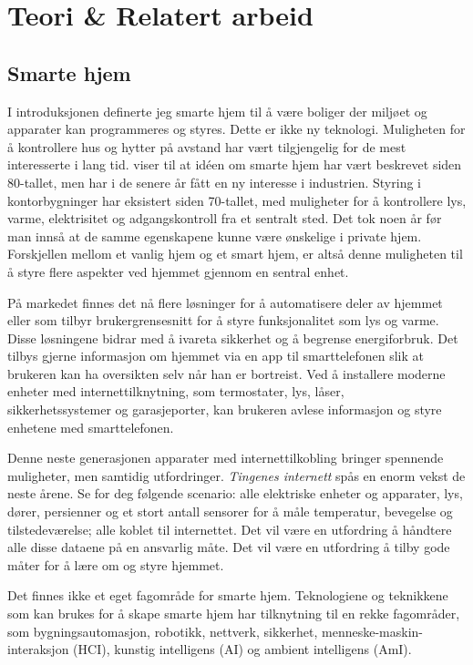 \section[Teori \& Relatert arbeid]{Teori \& Relatert arbeid}
\subsection{Smarte hjem}
\label{ch:smartehjem}
I introduksjonen definerte jeg smarte hjem til å være boliger der miljøet og apparater kan programmeres og styres. Dette er ikke ny teknologi. Muligheten for å kontrollere hus og hytter på avstand har vært tilgjengelig for de mest interesserte i lang tid. \citet{peine08} viser til at idéen om smarte hjem har vært beskrevet siden 80-tallet, men har i de senere år fått en ny interesse i industrien. Styring i kontorbygninger har eksistert siden 70-tallet, med muligheter for å kontrollere lys, varme, elektrisitet og adgangskontroll fra et sentralt sted. Det tok noen år før man innså at de samme egenskapene kunne være ønskelige i private hjem. Forskjellen mellom et vanlig hjem og et smart hjem, er altså denne muligheten til å styre flere aspekter ved hjemmet gjennom en sentral enhet.

På markedet finnes det nå flere løsninger for å automatisere deler av hjemmet eller som tilbyr brukergrensesnitt for å styre funksjonalitet som lys og varme. Disse løsningene bidrar med å ivareta sikkerhet og å begrense energiforbruk. Det tilbys gjerne informasjon om hjemmet via en app til smarttelefonen slik at brukeren kan ha oversikten selv når han er bortreist. Ved å installere moderne enheter med internettilknytning, som termostater, lys, låser, \\sikkerhetssystemer og garasjeporter, kan brukeren avlese informasjon og styre enhetene med smarttelefonen.

Denne neste generasjonen apparater med internettilkobling bringer spennende muligheter, men samtidig utfordringer. \emph{Tingenes internett} spås en enorm vekst de neste årene. Se for deg følgende scenario: alle elektriske enheter og apparater, lys, dører, persienner og et stort antall sensorer for å måle temperatur, bevegelse og tilstedeværelse; alle koblet til internettet. Det vil være en utfordring å håndtere alle disse dataene på en ansvarlig måte. Det vil være en utfordring å tilby gode måter for å lære om og styre hjemmet.

Det finnes ikke et eget fagområde for smarte hjem. Teknologiene og teknikkene som kan brukes for å skape smarte hjem har tilknytning til en rekke fagområder, som bygningsautomasjon, robotikk, nettverk, sikkerhet, menneske-maskin-interaksjon (HCI), kunstig intelligens (AI) og ambient intelligens (AmI).

